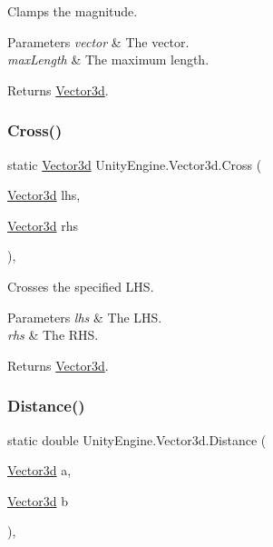 Clamps the magnitude. 


\begin{DoxyParams}{Parameters}
{\em vector} & The vector.\\
\hline
{\em max\+Length} & The maximum length.\\
\hline
\end{DoxyParams}
\begin{DoxyReturn}{Returns}
\hyperlink{struct_unity_engine_1_1_vector3d}{Vector3d}.
\end{DoxyReturn}
\mbox{\label{struct_unity_engine_1_1_vector3d_ad5a28b0a65ef2e9114f62e397f28f608}} 
\subsubsection{\texorpdfstring{Cross()}{Cross()}}
{\footnotesize\ttfamily static \hyperlink{struct_unity_engine_1_1_vector3d}{Vector3d} Unity\+Engine.\+Vector3d.\+Cross (\begin{DoxyParamCaption}\item[{\hyperlink{struct_unity_engine_1_1_vector3d}{Vector3d}}]{lhs,  }\item[{\hyperlink{struct_unity_engine_1_1_vector3d}{Vector3d}}]{rhs }\end{DoxyParamCaption})\hspace{0.3cm}{\ttfamily [inline]}, {\ttfamily [static]}}



Crosses the specified L\+HS. 


\begin{DoxyParams}{Parameters}
{\em lhs} & The L\+HS.\\
\hline
{\em rhs} & The R\+HS.\\
\hline
\end{DoxyParams}
\begin{DoxyReturn}{Returns}
\hyperlink{struct_unity_engine_1_1_vector3d}{Vector3d}.
\end{DoxyReturn}
\mbox{\label{struct_unity_engine_1_1_vector3d_a26384a77846e070e38446963b2fb2729}} 
\subsubsection{\texorpdfstring{Distance()}{Distance()}}
{\footnotesize\ttfamily static double Unity\+Engine.\+Vector3d.\+Distance (\begin{DoxyParamCaption}\item[{\hyperlink{struct_unity_engine_1_1_vector3d}{Vector3d}}]{a,  }\item[{\hyperlink{struct_unity_engine_1_1_vector3d}{Vector3d}}]{b }\end{DoxyParamCaption})\hspace{0.3cm}{\ttfamily [inline]}, {\ttfamily [static]}}



